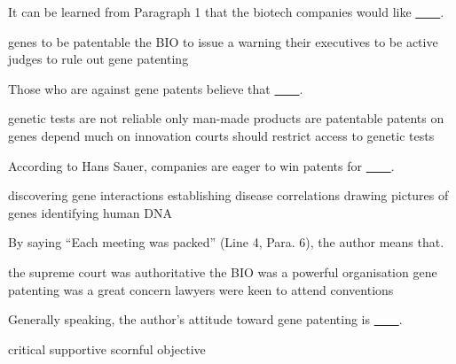 \item It can be learned from Paragraph 1 that the biotech companies would like \uline{~~~~}.
\begin{tasks}
	\task genes to be patentable
	\task the BIO to issue a warning
	\task their executives to be active
	\task judges to rule out gene patenting
\end{tasks}
\item Those who are against gene patents believe that \uline{~~~~}.
\begin{tasks}
	\task genetic tests are not reliable
	\task only man-made products are patentable
	\task patents on genes depend much on innovation
	\task courts should restrict access to genetic tests
\end{tasks}
\item According to Hans Sauer, companies are eager to win patents for \uline{~~~~}.
\begin{tasks}
	\task discovering gene interactions
	\task establishing disease correlations
	\task drawing pictures of genes
	\task identifying human DNA
\end{tasks}
\item By saying ``Each meeting was packed'' (Line 4, Para. 6), the author means that.
\begin{tasks}
	\task the supreme court was authoritative
	\task the BIO was a powerful organisation
	\task gene patenting was a great concern
	\task lawyers were keen to attend conventions
\end{tasks}
\item Generally speaking, the author's attitude toward gene patenting is \uline{~~~~}.
\begin{tasks}
	\task critical
	\task supportive
	\task scornful
	\task objective
\end{tasks}